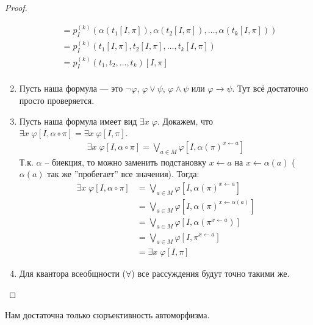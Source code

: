 \begin{proof}
\begin{enumerate}
\begin{align*}
            &= p^{(k)}_I(\alpha(t_1[I, \pi]), \alpha(t_2[I, \pi]), \dots, \alpha(t_k[I, \pi])) \\
            &= p^{(k)}_I(t_1[I, \pi], t_2[I, \pi], \dots, t_k[I, \pi]) \\
            &= p^{(k)}_I(t_1, t_2, \dots, t_k)[I, \pi] \\
        \end{align*}
        \item Пусть наша формула --- это $\lnot \varphi$, $\varphi \vee \psi$, $\varphi \wedge \psi$ или $\varphi \to \psi$. Тут всё достаточно просто проверяется.
        \item Пусть наша формула имеет вид $\exists x \; \varphi$. Докажем, что $\exists x \; \varphi[I, \alpha \circ \pi] = \exists x \; \varphi[I, \pi]$.
        \begin{align*}
            \exists x \; \varphi[I, \alpha \circ \pi] = \bigvee_{a \in M} \varphi[I, \alpha(\pi)^{x \leftarrow a}]
        \end{align*}
        Т.к. $\alpha$ -- биекция, то можно заменить подстановку $x \leftarrow a$ на $x \leftarrow \alpha(a)$ ($\alpha(a)$ так же ''пробегает'' все значения). Тогда:
        \begin{align*}
            \exists x \; \varphi[I, \alpha \circ \pi] &= \bigvee_{a \in M} \varphi[I, \alpha(\pi)^{x \leftarrow a}] \\
            &= \bigvee_{a \in M} \varphi[I, \alpha(\pi)^{x \leftarrow \alpha(a)}] \\
            &= \bigvee_{a \in M} \varphi[I, \alpha(\pi^{x \leftarrow a})] \\
            &= \bigvee_{a \in M} \varphi[I, \pi^{x \leftarrow a}] \\
            &= \exists x \; \varphi[I, \pi]
        \end{align*}
        \item Для квантора всеобщности ($\forall$) все рассуждения будут точно такими же.
    \end{enumerate}
\end{proof}
\notice \; Нам достаточна только сюръективность автоморфизма.

